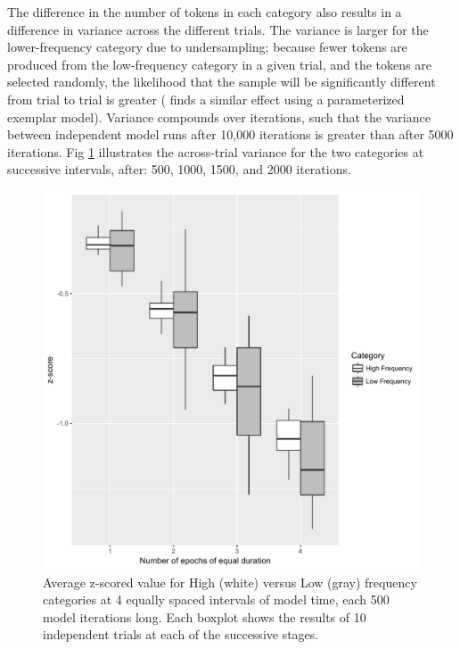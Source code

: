 The difference in the number of tokens in each category also results
in a difference in variance across the different trials. The variance
is larger for the lower-frequency category due to undersampling; because
fewer tokens are produced from the low-frequency category in a given
trial, and the tokens are selected randomly, the likelihood that the
sample will be significantly different from trial to trial is greater
(\citet{Soskuthy} finds a similar effect using a parameterized exemplar
model). Variance compounds over iterations, such that the variance
between independent model runs after 10,000 iterations is greater
than after 5000 iterations. Fig \ref{fig:Frequency Catch Up} illustrates
the across-trial variance for the two categories at successive intervals,
after: 500, 1000, 1500, and 2000 iterations.

\begin{figure}[H]
\centering{}\includegraphics[scale=0.3]{figures/FrequencyOverTime.pdf}\caption{\label{fig:Frequency Catch Up}Average z-scored value for High (white)
versus Low (gray) frequency categories at 4 equally spaced intervals
of model time, each 500 model iterations long. Each boxplot shows
the results of 10 independent trials at each of the successive stages.}
\end{figure}

